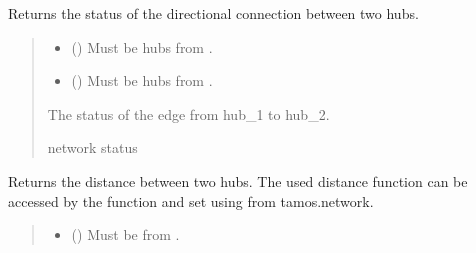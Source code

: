 \documentclass[letterpaper,10pt,english]{sphinxmanual}
\begin{document}
\begin{fulllineitems}
\begin{fulllineitems}
\label{\detokenize{generated/tamos.network.NonThermalNetwork:tamos.network.NonThermalNetwork.get_connection_status}}
\pysigstartsignatures
{}
\pysigstopsignatures
\sphinxAtStartPar
Returns the status of the directional connection between two hubs.
\begin{quote}\begin{description}
\begin{itemize}
\item {} 
\sphinxAtStartPar
{} ({\hyperref[\detokenize{generated/tamos.Hub:tamos.Hub}]{}}) \textendash{} Must be hubs from .

\item {} 
\sphinxAtStartPar
{} ({\hyperref[\detokenize{generated/tamos.Hub:tamos.Hub}]{}}) \textendash{} Must be hubs from .

\end{itemize}

\sphinxAtStartPar
The status of the edge from hub\_1 to hub\_2.

\sphinxAtStartPar
network status

\end{description}\end{quote}

\end{fulllineitems}


\begin{fulllineitems}
\label{\detokenize{generated/tamos.network.NonThermalNetwork:tamos.network.NonThermalNetwork.get_distance}}
\pysigstartsignatures
{}
\pysigstopsignatures
\sphinxAtStartPar
Returns the distance between two hubs.
The used distance function can be accessed by the  function
and set using  from tamos.network.
\begin{quote}\begin{description}
\begin{itemize}
\item {} 
\sphinxAtStartPar
{} ({\hyperref[\detokenize{generated/tamos.Hub:tamos.Hub}]{}}) \textendash{} Must be from .


\end{itemize}
\end{description}
\end{quote}
\end{fulllineitems}
\end{fulllineitems}
\end{document}
